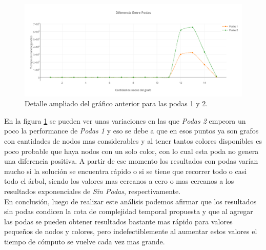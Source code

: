  \begin{figure}[H]
	\centering
 	\includegraphics[scale=0.45]{imagenes/Ej2/NodosPodas.png}
	\caption{Detalle ampliado del gráfico anterior para las podas 1 y 2.}
	\label{nodosP}
 \end{figure}

 En la figura \ref{nodosP} se pueden ver unas variaciones en las que \emph{Podas 2} empeora un poco la performance de \emph{Podas 1} y eso se debe a que en esos puntos ya son grafos con cantidades de nodos mas considerables y al tener tantos colores disponibles es poco probable que haya nodos con un solo color, con lo cual esta poda no genera una diferencia positiva. A partir de ese momento los resultados con podas varían mucho si la solución se encuentra rápido o si se tiene que recorrer todo o casi todo el árbol, siendo los valores mas cercanos a cero o mas cercanos a los resultados exponenciales de \emph{Sin Podas}, respectivamente.\\

 En conclusión, luego de realizar este análisis podemos afirmar que los resultados sin podas condicen la cota de complejidad temporal propuesta y que al agregar las podas se pueden obtener resultados bastante mas rápido para valores pequeños de nodos y colores, pero indefectiblemente al aumentar estos valores el tiempo de cómputo se vuelve cada vez mas grande.
